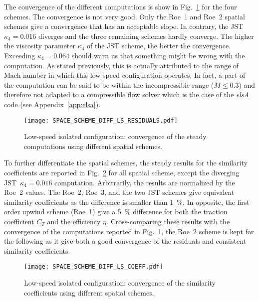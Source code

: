 The convergence of the different computations is show 
in Fig.~\ref{fig:dream_ls_space_scheme_residual}
for the four schemes. The convergence is not 
very good. Only the Roe~1 and Roe~2 spatial schemes give 
a convergence that has an acceptable slope. In contrary,
the JST~$\kappa_4 = 0.016$ diverges and the three
remaining schemes hardly converge. The higher the
viscosity parameter $\kappa_4$ of the JST scheme, the better
the convergence. Exceeding $\kappa_4 = 0.064$ should
warn us that something might be wrong with the computation.
As stated previously, this is actually attributed to the range of Mach
number in which this low-speed configuration operates. In fact,
a part of the computation can be said to be within the incompressible
range ($M \leq 0.3$) and therefore not adapted to a compressible
flow solver which is the case of the \emph{elsA} code 
(see Appendix~\ref{app:elsa}).
\begin{figure}[htp]
  \centering
  \texttt{[image: SPACE\_SCHEME\_DIFF\_LS\_RESIDUALS.pdf]}
  \caption{Low-speed isolated configuration: convergence of the
  steady computations using different spatial schemes.}
  \label{fig:dream_ls_space_scheme_residual}
\end{figure}

To further differentiate the spatial schemes, 
the steady results for the similarity coefficients are reported
in Fig.~\ref{fig:dream_ls_space_scheme_coeff} for all spatial scheme, 
except the diverging JST~$\kappa_4 = 0.016$ computation.
Arbitrarily, the results are normalized by the Roe~2 values.
The Roe~2, Roe~3, and the two JST schemes give equivalent
similarity coefficients as the difference is smaller than 1~\%.
In opposite, the first order upwind scheme (Roe~1) give a 5~\%
difference for both the traction coefficient $C_T$ and the efficiency $\eta$.
Cross-comparing these results with the convergence of the computations
reported in Fig.~\ref{fig:dream_ls_space_scheme_residual}, the Roe~2
scheme is kept for the following as it give both a good convergence
of the residuals and consistent similarity coefficients.
\begin{figure}[htp]
  \centering
  \texttt{[image: SPACE\_SCHEME\_DIFF\_LS\_COEFF.pdf]}
  \caption{Low-speed isolated configuration: convergence of the 
  similarity coefficients using different spatial schemes.}
  \label{fig:dream_ls_space_scheme_coeff}
\end{figure}

